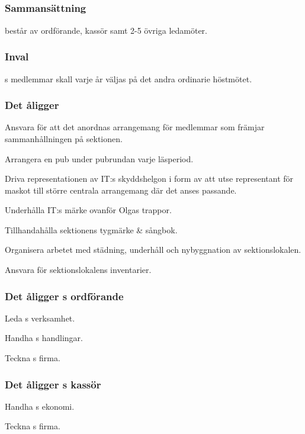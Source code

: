 \subsection{\PRITFULL}
\subsubsection{Sammansättning}
\PRIT{} består av ordförande, kassör samt 2-5 övriga ledamöter.

\subsubsection{Inval}
\PRIT{}s medlemmar skall varje år väljas på det andra ordinarie höstmötet.

\subsubsection{Det åligger \PRIT}
\begin{att}
	\item Ansvara för att det anordnas arrangemang för medlemmar som främjar sammanhållningen på sektionen.
	\item Arrangera en pub under pubrundan varje läsperiod.
	\item Driva representationen av IT:s skyddshelgon i form av att utse representant för maskot till större centrala arrangemang där det anses passande.
	\item Underhålla IT:s märke ovanför Olgas trappor.
	\item Tillhandahålla sektionens tygmärke \& sångbok.
	\item Organisera arbetet med städning, underhåll och nybyggnation av sektionslokalen.
	\item Ansvara för sektionslokalens inventarier.
\end{att}

\subsubsection{Det åligger \PRIT{}s ordförande}
\begin{att}
	\item Leda \PRIT{}s verksamhet.
	\item Handha \PRIT{}s handlingar.
	\item Teckna \PRIT{}s firma.
\end{att}

\subsubsection{Det åligger \PRIT{}s kassör}
\begin{att}
	\item Handha \PRIT{}s ekonomi.
	\item Teckna \PRIT{}s firma.
\end{att}

